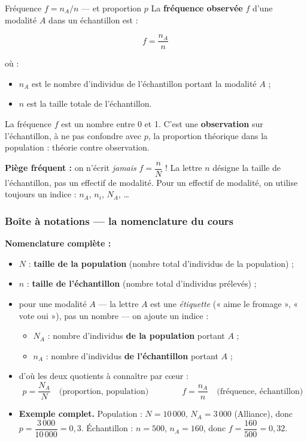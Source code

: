 \documentclass[11pt,a4paper]{article}
\begin{document}
	\begin{fiche}{Fréquence $f = n_A / n$ — et proportion $p$}
		La \textbf{fréquence observée} $f$ d'une modalité $A$ dans un échantillon est :
		\begin{formule}
			\[ f = \dfrac{n_A}{n} \]
		\end{formule}
		où :
		\begin{itemize}
			\item $n_A$ est le nombre d'individus de l'échantillon portant la modalité $A$ ;
			\item $n$ est la taille totale de l'échantillon.
		\end{itemize}
		La fréquence $f$ est un nombre entre 0 et 1. C'est une \textbf{observation} sur
		l'échantillon, à ne pas confondre avec $p$, la proportion théorique dans la
		population : théorie contre observation.
		\begin{notebox}
			\textbf{Piège fréquent :} on n'écrit \emph{jamais} $f = \dfrac{n}{N}$ ! La lettre
			$n$ désigne la taille de l'échantillon, pas un effectif de modalité. Pour un
			effectif de modalité, on utilise toujours un indice : $n_A$, $n_i$, $N_A$, \ldots
		\end{notebox}
	\end{fiche}
	
	\subsubsection{Boîte à notations — la nomenclature du cours}
	
	\begin{notebox}
		\textbf{Nomenclature complète :}
		\begin{itemize}
			\item $N$ : \textbf{taille de la population} (nombre total d'individus de la
			population) ;
			\item $n$ : \textbf{taille de l'échantillon} (nombre total d'individus prélevés) ;
			\item pour une modalité $A$ — la lettre $A$ est une \emph{étiquette}
			(« aime le fromage », « vote oui »), pas un nombre — on ajoute un indice :
			\begin{itemize}
				\item $N_A$ : nombre d'individus \textbf{de la population} portant $A$ ;
				\item $n_A$ : nombre d'individus \textbf{de l'échantillon} portant $A$ ;
			\end{itemize}
			\item d'où les deux quotients à connaître par cœur :
			\[ p = \dfrac{N_A}{N} \quad\text{(proportion, population)} \qquad\qquad
			f = \dfrac{n_A}{n} \quad\text{(fréquence, échantillon)} \]
			\item \textbf{Exemple complet.} Population : $N = 10\,000$,
			$N_A = 3\,000$ (Alliance), donc $p = \dfrac{3\,000}{10\,000} = 0{,}3$.
			Échantillon : $n = 500$, $n_A = 160$, donc
			$f = \dfrac{160}{500} = 0{,}32$.
		\end{itemize}
	\end{notebox}
	
\end{document}
